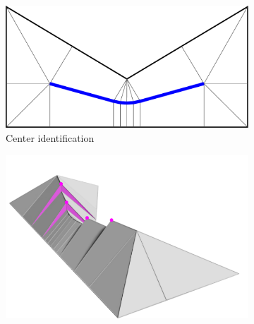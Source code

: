\begin{figure}
\begin{subfigure}{\figwidth}
\includegraphics[width=\figheight]{sources/method/overview/2D/marked.pdf}
\caption{Center identification}\label{3d_surface_overview_center}
\end{subfigure}
\begin{subfigure}{\figwidth}\centering
\hspace*{\tempheightTwo}
\includegraphics[height=\figheight]{sources/method/overview/surface/quantized.png}

\vspace{\tempheight}


\end{subfigure}
\end{figure}
